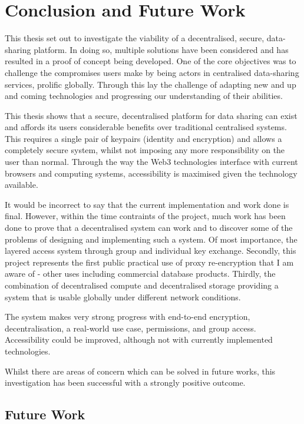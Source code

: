 \section{Conclusion and Future Work}

This thesis set out to investigate the viability of a decentralised, secure, data-sharing platform. In doing so, multiple solutions have been considered and has resulted in a proof of concept being developed. One of the core objectives was to challenge the compromises users make by being actors in centralised data-sharing services, prolific globally. Through this lay the challenge of adapting new and up and coming technologies and progressing our understanding of their abilities.

This thesis shows that a secure, decentralised platform for data sharing can exist and affords its users considerable benefits over traditional centralised systems. This requires a single pair of keypairs (identity and encryption) and allows a completely secure system, whilst not imposing any more responsibility on the user than normal. Through the way the Web3 technologies interface with current browsers and computing systems, accessibility is maximised given the technology available.

It would be incorrect to say that the current implementation and work done is final. However, within the time contraints of the project, much work has been done to prove that a decentralised system can work and to discover some of the problems of designing and implementing such a system. Of most importance, the layered access system through group and individual key exchange. Secondly, this project represents the first public practical use of proxy re-encryption that I am aware of - other uses including commercial database products. Thirdly, the combination of decentralised compute and decentralised storage providing a system that is usable globally under different network conditions.

The system makes very strong progress with end-to-end encryption, decentralisation, a real-world use case, permissions, and group access. Accessibility could be improved, although not with currently implemented technologies.

Whilst there are areas of concern which can be solved in future works, this investigation has been successful with a strongly positive outcome.

\subsection{Future Work}

